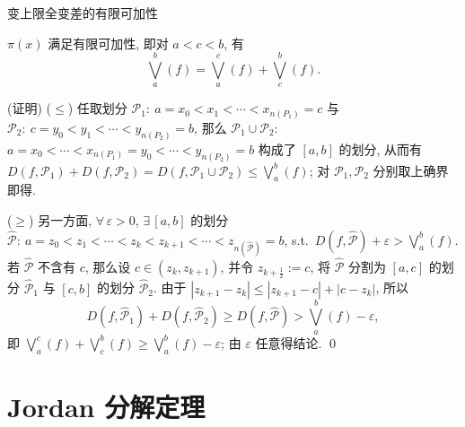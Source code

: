 \begin{frame}{变上限全变差的有限可加性}

\begin{lem}
$\pi(x)$ 满足有限可加性, 即对 $a < c < b$, 有
\[
\bigvee_a^b (f) = \bigvee_a^c (f) + \bigvee_c^b (f) .
\]
\end{lem}

\startproof[bg=yellow, fg=red](证明)
($\leqslant$) 任取划分
$\mathscr{P}_1:\ a = x_0 < x_1 < \cdots < x_{n(P_1)} = c$ 与
$\mathscr{P}_2:\ c = y_0 < y_1 < \cdots < y_{n(P_2)} = b$,
那么 $\mathscr{P}_1 \cup \mathscr{P}_2$:
$a = x_0 < \cdots < x_{n(P_1)} = y_0 < \cdots < y_{n(P_2)} = b$
构成了 $[a, b]$ 的划分, 从而有
$D(f, \mathscr{P}_1) + D(f, \mathscr{P}_2) = D(f, \mathscr{P}_1 \cup \mathscr{P}_2)
\leqslant \bigvee_a^b (f)$; 对 $\mathscr{P}_1, \mathscr{P}_2$ 分别取上确界即得.

\pause

($\geqslant$) 另一方面, $\forall\, \varepsilon > 0$, $\exists\, [a, b]$ 的划分
$\widehat{\mathscr{P}}:\ a = z_0 < z_1 < \cdots < z_k < z_{k+1} < \cdots < z_{n(\widehat{\mathscr{P}})} = b$,
s.t.\ $D(f, \widehat{\mathscr{P}}) + \varepsilon > \bigvee_a^b (f)$.
若 $\widehat{\mathscr{P}}$ 不含有 $c$, 那么设 $c \in (z_k, z_{k+1})$, 并令 $z_{k + \frac12} := c$,
将 $\widehat{\mathscr{P}}$ 分割为 $[a, c]$ 的划分 $\widehat{\mathscr{P}}_1$ 与
$[c, b]$ 的划分 $\widehat{\mathscr{P}}_2$. 由于 $|z_{k+1} - z_k| \leqslant |z_{k+1} - c| + |c - z_k|$, 所以
\[
D(f, \widehat{\mathscr{P}}_1) + D(f, \widehat{\mathscr{P}}_2)
\geqslant D(f, \widehat{\mathscr{P}})
> \bigvee_a^b (f) - \varepsilon ,
\]
即 $\bigvee_a^c (f) + \bigvee_c^b (f) \geqslant \bigvee_a^b (f) - \varepsilon$; 由 $\varepsilon$ 任意得结论.
\qed

\end{frame}


\section[Jordan 分解]{Jordan 分解定理}



